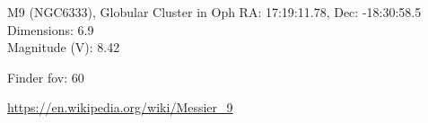 \begin{block}{M9 (NGC6333), Globular Cluster in Oph}
    RA: 17:19:11.78, Dec: -18:30:58.5 \\ 
    Dimensions: 6.9 \\ 
    Magnitude (V): 8.42



    Finder fov: 60 

    \url{https://en.wikipedia.org/wiki/Messier_9} 
\end{block}